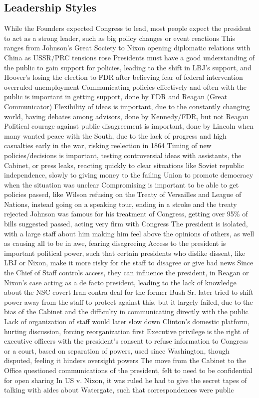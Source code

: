 \documentclass[11 pt, twoside]{article}
\newenvironment{outline*}
{
	\begin{outline}[enumerate]
	}
	{\end{outline}
}
\begin{document}
\subsection{Leadership Styles}
\begin{outline*}
\1 While the Founders expected Congress to lead, most people expect the president to act as a strong leader, such as big policy changes or event reactions
\2 This ranges from Johnson’s Great Society to Nixon opening diplomatic relations with China as USSR/PRC tensions rose
\1 Presidents must have a good understanding of the public to gain support for policies, leading to the shift in LBJ’s support, and Hoover’s losing the election to FDR after believing fear of federal intervention overruled unemployment
\2 Communicating policies effectively and often with the public is important in getting support, done by FDR and Reagan (Great Communicator)
\2 Flexibility of ideas is important, due to the constantly changing world, having debates among advisors, done by Kennedy/FDR, but not Reagan
\2 Political courage against public disagreement is important, done by Lincoln when many wanted peace with the South, due to the lack of progress and high casualties early in the war, risking reelection in 1864
\2 Timing of new policies/decisions is important, testing controversial ideas with assistants, the Cabinet, or press leaks, reacting quickly to clear situations like Soviet republic independence, slowly to giving money to the failing Union to promote democracy when the situation was unclear
\2 Compromising is important to be able to get policies passed, like Wilson refusing on the Treaty of Versailles and League of Nations, instead going on a speaking tour, ending in a stroke and the treaty rejected
\2 Johnson was famous for his treatment of Congress, getting over 95\% of bills suggested passed, acting very firm with Congress
\1 The president is isolated, with a large staff about him making him feel above the opinions of others, as well as causing all to be in awe, fearing disagreeing
\2 Access to the president is important political power, such that certain presidents who dislike dissent, like LBJ or Nixon, make it more risky for the staff to disagree or give bad news
\2 Since the Chief of Staff controls access, they can influence the president, in Reagan or Nixon’s case acting as a de facto president, leading to the lack of knowledge about the NSC covert Iran contra deal for the former
\2 Bush Sr. later tried to shift power away from the staff to protect against this, but it largely failed, due to the bias of the Cabinet and the difficulty in communicating directly with the public
\2 Lack of organization of staff would later slow down Clinton’s domestic platform, hurting discussion, forcing reorganization first
\1 Executive privilege is the right of executive officers with the president’s consent to refuse information to Congress or a court, based on separation of powers, used since Washington, though disputed, feeling it hinders oversight powers
\2 The move from the Cabinet to the Office questioned communications of the president, felt to need to be confidential for open sharing
\2 In US v. Nixon, it was ruled he had to give the secret tapes of talking with aides about Watergate, such that correspondences were public
\end{outline*}
\end{document}
